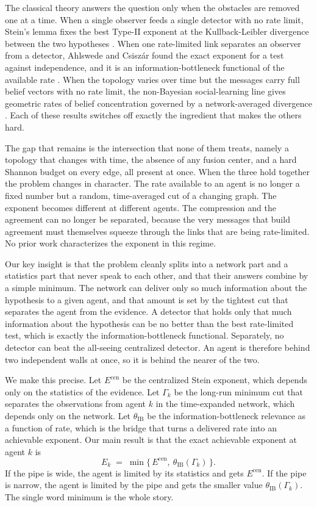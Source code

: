 \documentclass[journal]{IEEEtran}
\theoremstyle{definition}
\theoremstyle{remark}
\newcommand{\Ecen}{E^{\mathrm{cen}}}
\newcommand{\tib}{\theta_{\mathrm{IB}}}
\newcommand{\Gk}{\Gamma_k}
\begin{document}
The classical theory answers the question only when the obstacles are removed one at a time. When a single
observer feeds a single detector with no rate limit, Stein's lemma fixes the best Type-II exponent at the
Kullback-Leibler divergence between the two hypotheses \cite{chernoff1952,coverthomas2006}. When one rate-limited
link separates an observer from a detector, Ahlswede and Csisz\'ar found the exact exponent for a test against
independence, and it is an information-bottleneck functional of the available rate \cite{ahlswedecsiszar1986}.
When the topology varies over time but the messages carry full belief vectors with no rate limit, the
non-Bayesian social-learning line gives geometric rates of belief concentration governed by a network-averaged
divergence \cite{nou2017,lalitha2018,shahrampour2016}. Each of these results switches off exactly the ingredient
that makes the others hard.

The gap that remains is the intersection that none of them treats, namely a topology that changes with time, the
absence of any fusion center, and a hard Shannon budget on every edge, all present at once. When the three hold
together the problem changes in character. The rate available to an agent is no longer a fixed number but a
random, time-averaged cut of a changing graph. The exponent becomes different at different agents. The
compression and the agreement can no longer be separated, because the very messages that build agreement must
themselves squeeze through the links that are being rate-limited. No prior work characterizes the exponent in
this regime.

Our key insight is that the problem cleanly splits into a network part and a statistics part that never speak to
each other, and that their answers combine by a simple minimum. The network can deliver only so much information
about the hypothesis to a given agent, and that amount is set by the tightest cut that separates the agent from
the evidence. A detector that holds only that much information about the hypothesis can be no better than the
best rate-limited test, which is exactly the information-bottleneck functional. Separately, no detector can beat
the all-seeing centralized detector. An agent is therefore behind two independent walls at once, so it is behind
the nearer of the two.

We make this precise. Let $\Ecen$ be the centralized Stein exponent, which depends only on the statistics of the
evidence. Let $\Gk$ be the long-run minimum cut that separates the observations from agent $k$ in the
time-expanded network, which depends only on the network. Let $\tib$ be the information-bottleneck relevance as a
function of rate, which is the bridge that turns a delivered rate into an achievable exponent. Our main result is
that the exact achievable exponent at agent $k$ is
\begin{equation}
E_k \;=\; \min\{\,\Ecen,\ \tib(\Gk)\,\}. \label{eq:main}
\end{equation}
If the pipe is wide, the agent is limited by its statistics and gets $\Ecen$. If the pipe is narrow, the agent is
limited by the pipe and gets the smaller value $\tib(\Gk)$. The single word minimum is the whole story.
\end{document}
